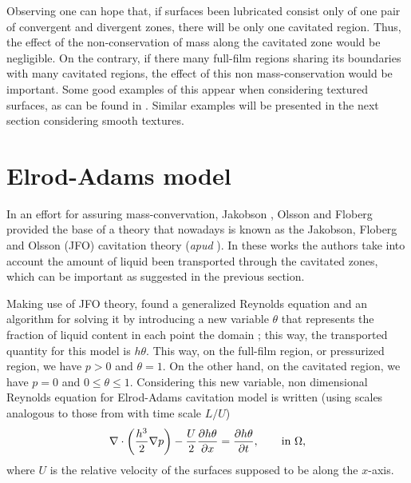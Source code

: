 Observing  one can hope that, if surfaces been lubricated consist only of one pair of convergent and divergent zones, there will be only one cavitated region. Thus, the effect of the non-conservation of mass along the cavitated zone would be negligible. On the contrary, if there many full-film regions sharing its boundaries with many cavitated regions, the effect of this non mass-conservation would be important. Some good examples of this appear when considering textured surfaces, as can be found in \cite{ausas07}. Similar examples will be presented in the next section considering smooth textures.
\section{Elrod-Adams model}\label{sec:elrod_adams_model}
In an effort for assuring mass-convervation, Jakobson \cite{jakobson1}, Olsson \cite{olsson1} and Floberg \cite{floberg73,floberg74} provided the base of a theory that nowadays is known as the Jakobson, Floberg and Olsson (JFO) cavitation theory (\emph{apud} \cite{braun2010}). In these works the authors take into account the amount of liquid been transported through the cavitated zones, which can be important as suggested in the previous section.

Making use of JFO theory, \citeauthor{elrod1974} \cite{elrod1974} found a generalized Reynolds equation and an algorithm for solving it by introducing a new variable $\theta$ that represents the fraction of liquid content in each point the domain \cite{braun2010}; this way, the transported quantity for this model is $h\theta$. This way, on the full-film region, or pressurized region, we have $p>0$ and $\theta=1$. On the other hand, on the cavitated region, we have $p=0$ and $0\leq \theta \leq 1$. Considering this new variable, non dimensional Reynolds equation for Elrod-Adams cavitation model is written (using scales analogous to those from  with time scale $L/U$)
\begin{equation}
\nabla \cdot \left( \frac{h^3}{2}\nabla p \right) -\frac{U}{2}\frac{\partial h\theta}{\partial x} = \frac{\partial h\theta}{\partial t} ,\qquad\text{in }\Omega,
\end{equation}
where $U$ is the relative velocity of the surfaces supposed to be along the $x$-axis.

